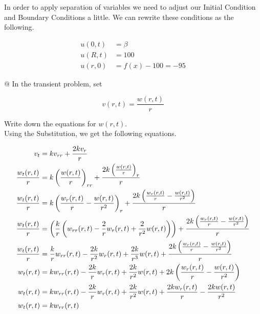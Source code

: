 \documentclass[10pt]{article}
\begin{document}
\begin{easylist}[enumerate]
    In order to apply separation of variables we need to adjust our Initial Condition and Boundary Conditions a little.
    We can rewrite these conditions as the following.

    \begin{align*}
        u(0, t) &= \beta\\
        u(R, t) &= 100\\
        u(r, 0) &= f(x) - 100 = -95
    \end{align*}

    @ In the transient problem, set

    \[
        v(r, t) = \frac{w(r, t)}{r}
    \]

    Write down the equations for $w(r, t)$.\\

    Using the Substitution, we get the following equations.

    \begin{align*}
        v_t &= kv_{rr} + \frac{2kv_r}{r}\\
        \frac{w_t(r, t)}{r} &= k\left( \frac{w(r, t)}{r} \right)_{rr} + \frac{2k\left( \frac{w(r, t)}{r} \right)_r}{r}\\
        \frac{w_t(r, t)}{r} &= k\left( \frac{w_r(r, t)}{r} - \frac{w(r, t)}{r^2} \right)_r + \frac{2k\left( \frac{w_r(r, t)}{r} - \frac{w(r, t)}{r^2} \right)}{r}\\
        \frac{w_t(r, t)}{r} &= \left( \frac{k}{r} \left(w_{rr}{\left (r , t\right )} - \frac{2}{r} w_r{\left (r, t \right)} + \frac{2}{r^{2}} w{\left (r, t \right )}\right) \right) +
                                \frac{2k\left( \frac{w_r(r, t)}{r} - \frac{w(r, t)}{r^2} \right)}{r}\\
        \frac{w_t(r, t)}{r} &= \frac{k}{r} w_{rr}{\left (r , t\right )} - \frac{2k}{r^2} w_r{\left (r, t \right)} + \frac{2k}{r^{3}} w{\left (r, t \right )} +
                                \frac{2k\left( \frac{w_r(r, t)}{r} - \frac{w(r, t)}{r^2} \right)}{r}\\
        w_t(r, t) &= k w_{rr}{\left (r , t\right )} - \frac{2k}{r} w_r{\left (r, t \right)} + \frac{2k}{r^{2}} w{\left (r, t \right )} +
                                2k\left( \frac{w_r(r, t)}{r} - \frac{w(r, t)}{r^2} \right)\\
        w_t(r, t) &= k w_{rr}{\left (r , t\right )} - \frac{2k}{r} w_r{\left (r, t \right)} + \frac{2k}{r^{2}} w{\left (r, t \right )} +
                                \frac{2kw_r(r, t)}{r} - \frac{2kw(r, t)}{r^2}\\
        w_t(r, t) &= k w_{rr}{\left (r , t\right )}\\
    \end{align*}


\end{easylist}
\end{document}
